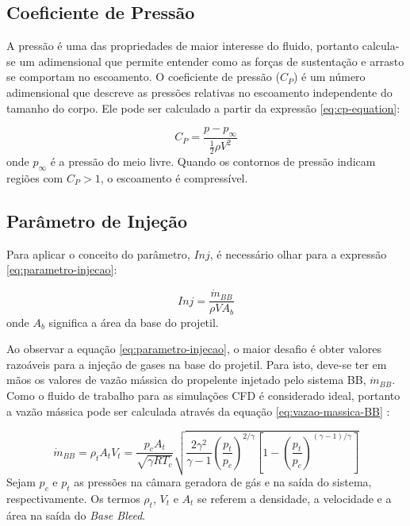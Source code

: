 \subsection{Coeficiente de Pressão}

A pressão é uma das propriedades de maior interesse do fluido, portanto calcula-se um adimensional que permite entender como as forças de sustentação e arrasto se comportam no escoamento. O coeficiente de pressão ($C_{P}$) é um número adimensional que descreve as pressões relativas no escoamento independente do tamanho do corpo. Ele pode ser calculado a partir da expressão \eqref{eq:cp-equation}: 

\begin{equation}\label{eq:cp-equation}
    C_P = \frac{p - p_{\infty}}{\frac{1}{2}\rho V^2}
\end{equation}
%
onde $p_{\infty}$ é a pressão do meio livre. Quando os contornos de pressão indicam regiões com $C_{P} > 1$, o escoamento é compressível.

\subsection{Parâmetro de Injeção}

Para aplicar o conceito do parâmetro, $Inj$, é necessário olhar para a expressão \eqref{eq:parametro-injecao}:

\begin{equation}\label{eq:parametro-injecao}
    Inj = \frac{\Dot{m}_{BB}}{\rho VA_{b}}
\end{equation}
%
onde $A_{b}$ significa a área da base do projetil. 

Ao observar a equação \ref{eq:parametro-injecao}, o maior desafio é obter valores razoáveis para a injeção de gases na base do projetil. Para isto, deve-se ter em mãos os valores de vazão mássica do propelente injetado pelo sistema BB, $\Dot{m}_{BB}$. Como o fluido de trabalho para as simulações CFD é considerado ideal, portanto a vazão mássica pode ser calculada através da equação \ref{eq:vazao-massica-BB} \cite{Gil2020}:

\begin{equation}\label{eq:vazao-massica-BB}
    \Dot{m}_{BB} = \rho_{t}A_{t}V_{t} = \frac{p_{c}A_{t}}{\sqrt{\gamma RT_{c}}}\sqrt{\frac{2\gamma^{2}}{\gamma - 1}\left(\frac{p_{t}}{p_{c}}\right)^{2/\gamma}\left[1-\left(\frac{p_{t}}{p_{c}}\right)^{(\gamma-1)/\gamma}\right]}
\end{equation}
%
Sejam $p_{c}$ e $p_{t}$ as pressões na câmara geradora de gás e na saída do sistema, respectivamente. Os termos $\rho_{t}$, $V_{t}$ e $A_{t}$ se referem a densidade, a velocidade e a área na saída do \textit{Base Bleed}. 

